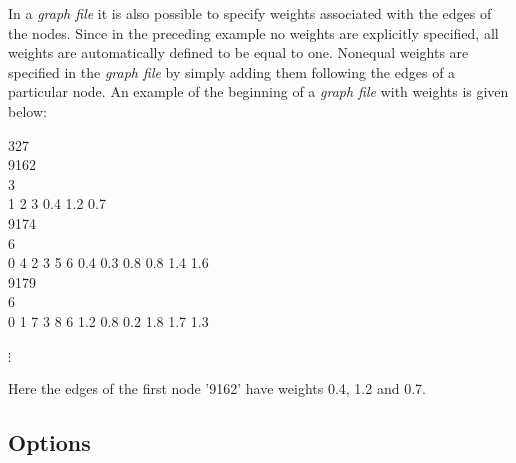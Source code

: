 In a {\em graph file} it is also possible to specify weights associated
with the edges of the nodes. Since in the preceding example no
weights are explicitly specified, all weights are automatically
defined to be equal to one. Nonequal weights are specified in the
{\em graph file} by simply adding them following the edges of a
particular node.
An example of the beginning of a {\em graph file} with weights is given below:

\footnotesize

327 \\
9162 \\
3 \\
1 2 3 0.4 1.2 0.7\\
9174 \\
6 \\
0 4 2 3 5 6 0.4 0.3 0.8 0.8 1.4 1.6\\
9179 \\
6 \\
0 1 7 3 8 6 1.2 0.8 0.2 1.8 1.7 1.3

\hspace{1cm} $\vdots$

\normalsize

\vspace{0.5cm}

Here the edges of the first node '9162' have weights 0.4, 1.2 and
0.7.

\subsection*{Options}


